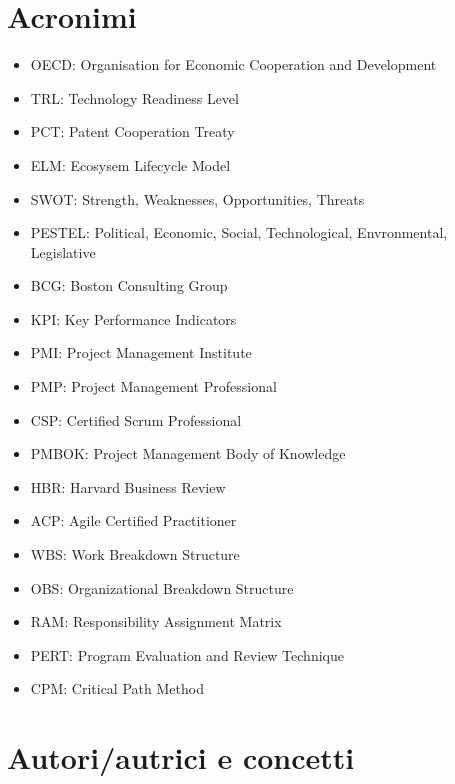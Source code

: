 \documentclass[answers, a4paper, 11pt]{exam}
\begin{document}
\section{Acronimi}
\begin{itemize}
    \item OECD: Organisation for Economic Cooperation and Development
    \item TRL: Technology Readiness Level
    \item PCT: Patent Cooperation Treaty
    \item ELM: Ecosysem Lifecycle Model
    \item SWOT: Strength, Weaknesses, Opportunities, Threats
    \item PESTEL: Political, Economic, Social, Technological, Envronmental, Legislative
    \item BCG: Boston Consulting Group
    \item KPI: Key Performance Indicators
    \item PMI: Project Management Institute
    \item PMP: Project Management Professional
    \item CSP: Certified Scrum Professional
    \item PMBOK: Project Management Body of Knowledge
    \item HBR: Harvard Business Review
    \item ACP: Agile Certified Practitioner
    \item WBS: Work Breakdown Structure
    \item OBS: Organizational Breakdown Structure
    \item RAM: Responsibility Assignment Matrix
    \item PERT: Program Evaluation and Review Technique
    \item CPM: Critical Path Method
\end{itemize}

\section{Autori/autrici e concetti}
\end{document}
